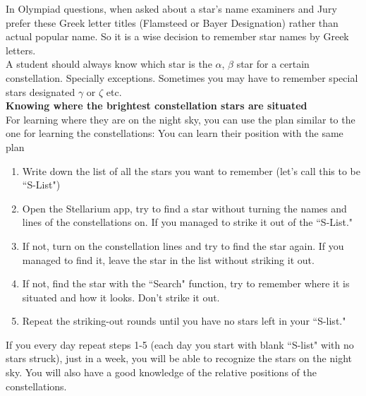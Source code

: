\documentclass[a4paper,12pt]{extarticle}
\begin{document}
In Olympiad questions, when asked about a star’s name examiners and Jury prefer these Greek letter titles (Flamsteed or Bayer Designation) rather than actual popular name. So it is a wise decision to remember star names by Greek letters.\\

A student should always know which star is the $\alpha$, $\beta$ star for a certain constellation. Specially exceptions. Sometimes you may have to remember special stars designated $\gamma$ or $\zeta$ etc.\\

\textbf{Knowing where the brightest constellation stars are situated}\\

For learning where they are on the night sky, you can use the plan similar to the one for learning the constellations:
You can learn their position with the same plan

\begin{enumerate}[1.]
	\item  Write down the list of all the stars you want to remember (let's call this to be ``S-List")
	\item Open the Stellarium app, try to find a star without turning the names and lines of the constellations on. If you managed to strike it out of the ``S-List."
	\item If not, turn on the constellation lines and try to find the star again. If you managed to find it, leave the star in the list without striking it out.
	\item If not, find the star with the ``Search" function, try to remember where it is situated and how it looks. Don't strike it out.
	\item  Repeat the striking-out rounds until you have no stars left in your ``S-list."
\end{enumerate}

If you every day repeat steps 1-5 (each day you start with blank ``S-list" with no stars struck), just in a week, you will be able to recognize the stars on the night sky. You will also have a good knowledge of the relative positions of the constellations.
\end{document}

